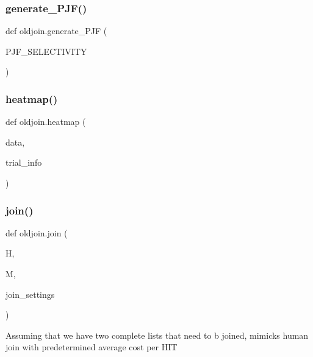 \mbox{\label{namespaceoldjoin_ab07f8db55282bc2c19e5c6ddbdfb820a}} 
\subsubsection{\texorpdfstring{generate\_PJF()}{generate\_PJF()}}
{\footnotesize\ttfamily def oldjoin.\+generate\+\_\+\+P\+JF (\begin{DoxyParamCaption}\item[{}]{P\+J\+F\+\_\+\+S\+E\+L\+E\+C\+T\+I\+V\+I\+TY }\end{DoxyParamCaption})}

\mbox{\label{namespaceoldjoin_ad1782de5b29177d53cd9ddf8972eee3c}} 
\subsubsection{\texorpdfstring{heatmap()}{heatmap()}}
{\footnotesize\ttfamily def oldjoin.\+heatmap (\begin{DoxyParamCaption}\item[{}]{data,  }\item[{}]{trial\+\_\+info }\end{DoxyParamCaption})}

\mbox{\label{namespaceoldjoin_a8636d8a4fb507de47bd554ef95397533}} 
\subsubsection{\texorpdfstring{join()}{join()}}
{\footnotesize\ttfamily def oldjoin.\+join (\begin{DoxyParamCaption}\item[{}]{H,  }\item[{}]{M,  }\item[{}]{join\+\_\+settings }\end{DoxyParamCaption})}

\begin{DoxyVerb}Assuming that we have two complete lists that need to b joined, mimicks human join
with predetermined average cost per HIT \end{DoxyVerb}
 \mbox{\label{namespaceoldjoin_ad2ce1a61d9eb32b5e5caedc2b9783a17}} 
